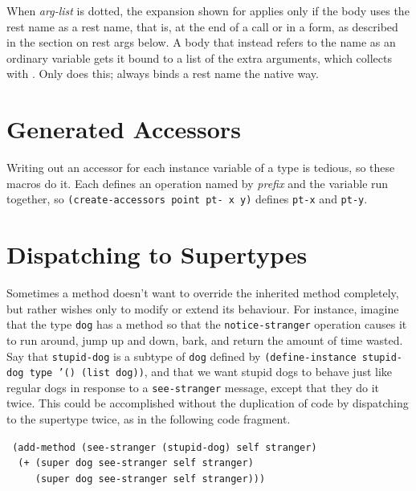 When \emph{arg-list} is dotted, the expansion shown for 
applies only if the body uses the rest name as a rest name, that is, at
the end of a call or in a  form, as described in the
section on rest args below.  A body that instead refers to the name as
an ordinary variable gets it bound to a list of the extra arguments,
which  collects with .  Only 
does this;  always binds a rest name the native way.



\section{Generated Accessors}

Writing out an accessor for each instance variable of a type is
tedious, so these macros do it.  Each defines an operation named by
\emph{prefix} and the variable run together, so
\texttt{(create-accessors point pt- x y)} defines \texttt{pt-x} and
\texttt{pt-y}.


\section{Dispatching to Supertypes}

Sometimes a method doesn't want to override the inherited method
completely, but rather wishes only to modify or extend its
behaviour.  For instance, imagine that the type \texttt{dog} has a method
so that the \texttt{notice-stranger} operation causes it to run around,
jump up and down, bark, and return the amount of time wasted.  Say
that \texttt{stupid-dog} is a subtype of \texttt{dog} defined by
\texttt{(define-instance stupid-dog type '() (list dog))}, and that we
want stupid dogs to behave just like regular dogs in response to a
\texttt{see-stranger} message, except that they do it twice.  This could
be accomplished without the duplication of code by dispatching to the
supertype twice, as in the following code fragment.
\begin{flushleft}\tt
(add-method (see-stranger (stupid-dog) self stranger)\\
~~(+ ({\upar}super dog see-stranger self stranger)\\
~~~~~({\upar}super dog see-stranger self stranger)))
\end{flushleft}


